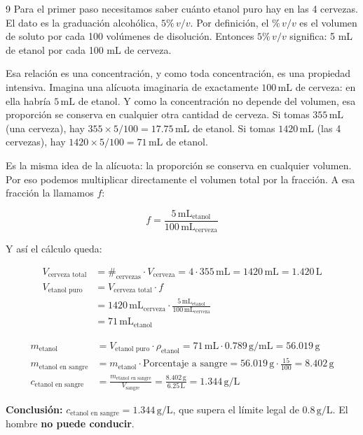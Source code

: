 \begin{exercise}{9}{}
Para el primer paso necesitamos saber cuánto etanol puro hay en las 4 cervezas. 
El dato es la graduación alcohólica, $5\%\,v/v$. Por definición, el $\%\,v/v$ 
es el volumen de soluto por cada 100 volúmenes de disolución. Entonces $5\%\,v/v$ 
significa: 5 mL de etanol por cada 100 mL de cerveza.

Esa relación es una concentración, y como toda concentración, es una propiedad 
intensiva. Imagina una alícuota imaginaria de exactamente $100\,\mathrm{mL}$ de 
cerveza: en ella habría $5\,\mathrm{mL}$ de etanol. Y como la concentración no 
depende del volumen, esa proporción se conserva en cualquier otra cantidad de 
cerveza. Si tomas $355\,\mathrm{mL}$ (una cerveza), hay 
$355 \times 5/100 = 17.75\,\mathrm{mL}$ de etanol. Si tomas $1420\,\mathrm{mL}$ 
(las 4 cervezas), hay $1420 \times 5/100 = 71\,\mathrm{mL}$ de etanol.

Es la misma idea de la alícuota: la proporción se conserva en cualquier volumen. 
Por eso podemos multiplicar directamente el volumen total por la fracción. A esa 
fracción la llamamos \(f\):

\[
f = \frac{5\,\mathrm{mL}_{\text{etanol}}}{100\,\mathrm{mL}_{\text{cerveza}}}
\]

Y así el cálculo queda:

\begin{align*}
    V_{\text{cerveza total}} &= \#_{\text{cervezas}} \cdot V_{\text{cerveza}}
    = 4 \cdot 355\,\mathrm{mL} 
    = 1420\,\mathrm{mL} = 1.420\,\mathrm{L} \\[4pt]
    V_{\text{etanol puro}} &= V_{\text{cerveza total}} \cdot f \\[4pt]
    &= 1420\,\mathrm{mL}_{\text{cerveza}} \cdot 
    \frac{5\,\mathrm{mL}_{\text{etanol}}}{100\,\mathrm{mL}_{\text{cerveza}}} \\[4pt]
    &= 71\,\mathrm{mL}_{\text{etanol}}
\end{align*}

\begin{align*}
    m_{\text{etanol}} &= V_{\text{etanol puro}} \cdot \rho_{\text{etanol}}
    = 71\,\mathrm{mL} \cdot 0.789\,\mathrm{g/mL}
    = 56.019\,\mathrm{g} \\[4pt]
    m_{\text{etanol en sangre}} &= m_{\text{etanol}} \cdot 
    \text{Porcentaje a sangre}
    = 56.019\,\mathrm{g} \cdot \frac{15}{100}
    = 8.402\,\mathrm{g} \\[4pt]
    c_{\text{etanol en sangre}} &= \frac{m_{\text{etanol en sangre}}}{V_{\text{sangre}}}
    = \frac{8.402\,\mathrm{g}}{6.25\,\mathrm{L}}
    = 1.344\,\mathrm{g/L}
\end{align*}

\textbf{Conclusión:} $c_{\text{etanol en sangre}} = 1.344\,\mathrm{g/L}$, que 
supera el límite legal de $0.8\,\mathrm{g/L}$. El hombre \textbf{no puede 
conducir}.
\end{exercise}


